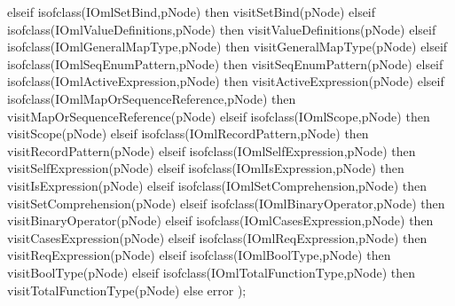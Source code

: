 \begin{vdm_al}
      elseif isofclass(IOmlSetBind,pNode) then visitSetBind(pNode)
      elseif isofclass(IOmlValueDefinitions,pNode) then visitValueDefinitions(pNode)
      elseif isofclass(IOmlGeneralMapType,pNode) then visitGeneralMapType(pNode)
      elseif isofclass(IOmlSeqEnumPattern,pNode) then visitSeqEnumPattern(pNode)
      elseif isofclass(IOmlActiveExpression,pNode) then visitActiveExpression(pNode)
      elseif isofclass(IOmlMapOrSequenceReference,pNode) then visitMapOrSequenceReference(pNode)
      elseif isofclass(IOmlScope,pNode) then visitScope(pNode)
      elseif isofclass(IOmlRecordPattern,pNode) then visitRecordPattern(pNode)
      elseif isofclass(IOmlSelfExpression,pNode) then visitSelfExpression(pNode)
      elseif isofclass(IOmlIsExpression,pNode) then visitIsExpression(pNode)
      elseif isofclass(IOmlSetComprehension,pNode) then visitSetComprehension(pNode)
      elseif isofclass(IOmlBinaryOperator,pNode) then visitBinaryOperator(pNode)
      elseif isofclass(IOmlCasesExpression,pNode) then visitCasesExpression(pNode)
      elseif isofclass(IOmlReqExpression,pNode) then visitReqExpression(pNode)
      elseif isofclass(IOmlBoolType,pNode) then visitBoolType(pNode)
      elseif isofclass(IOmlTotalFunctionType,pNode) then visitTotalFunctionType(pNode)
      else error );


\end{vdm_al}
